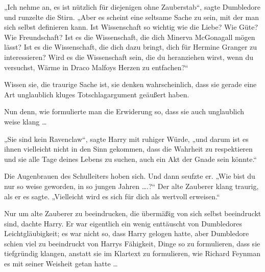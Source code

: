 „Ich nehme an, es ist nützlich für diejenigen ohne Zauberstab“, sagte Dumbledore und runzelte die Stirn.
„Aber es scheint eine seltsame Sache zu sein, mit der man sich selbst definieren kann. Ist Wissenschaft so wichtig wie die Liebe? Wie Güte? Wie Freundschaft? Ist es die Wissenschaft, die dich Minerva McGonagall mögen lässt? Ist es die Wissenschaft, die dich dazu bringt, dich für Hermine Granger zu interessieren? Wird es die Wissenschaft sein, die du heranziehen wirst, wenn du versuchst, Wärme in Draco Malfoys Herzen zu entfachen?“

Wissen sie, die traurige Sache ist, sie denken wahrscheinlich, dass sie gerade eine Art unglaublich kluges Totschlagargument geäußert haben.

Nun denn, wie formulierte man die Erwiderung so, dass sie auch unglaublich weise klang …

„Sie sind kein Ravenclaw“, sagte Harry mit ruhiger Würde, „und darum ist es ihnen vielleicht nicht in den Sinn gekommen, dass die Wahrheit zu respektieren und sie alle Tage deines Lebens zu suchen, auch ein Akt der Gnade sein könnte.“

Die Augenbrauen des Schulleiters hoben sich. Und dann seufzte er.
„Wie bist du nur so weise geworden, in so jungen Jahren ….?“ Der alte Zauberer klang traurig, als er es sagte.
„Vielleicht wird es sich für dich als wertvoll erweisen.“

Nur um alte Zauberer zu beeindrucken, die übermäßig von sich selbst beeindruckt sind, dachte Harry. Er war eigentlich ein wenig enttäuscht von Dumbledores Leichtgläubigkeit; es war nicht so, dass Harry gelogen hatte, aber Dumbledore schien viel zu beeindruckt von Harrys Fähigkeit, Dinge so zu formulieren, dass sie tiefgründig klangen, anstatt sie im Klartext zu formulieren, wie Richard Feynman es mit seiner Weisheit getan hatte …

